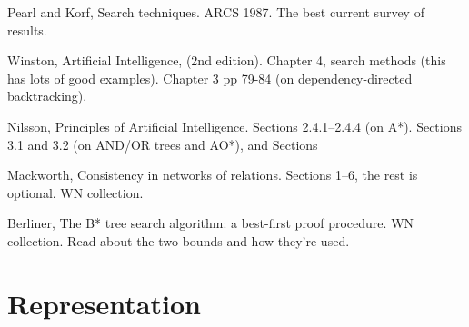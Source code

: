 \begin{required}

\paper Pearl and Korf, Search techniques.  ARCS 1987. The best current
survey of results.

\paper Winston, Artificial Intelligence, (2nd edition).  Chapter 4,
search methods (this has lots of good examples).  Chapter 3 pp 79-84
(on dependency-directed backtracking).

\paper Nilsson, Principles of Artificial Intelligence.  Sections
2.4.1--2.4.4 (on A*).  Sections 3.1 and 3.2 (on AND/OR trees and AO*),
and Sections

\paper Mackworth, Consistency in networks of relations.  Sections
1--6, the rest is optional. WN collection.

\end{required}

\begin{optional}

\paper   Berliner, The B* tree search algorithm: a best-first proof
     procedure.  WN collection.  Read about the two bounds and how
     they're used.

\end{optional}

\section{Representation}
\label{sec:representation}

